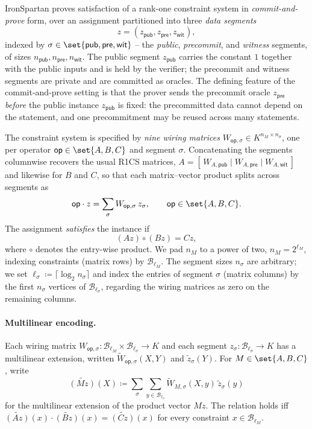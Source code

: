 \documentclass{article}
\theoremstyle{definition}
\newcommand*{\mle}{\widetilde}
\newcommand{\BB}{\mathcal{B}}
\begin{document}
IronSpartan proves satisfaction of a rank-one constraint system in \emph{commit-and-prove} form, over an assignment partitioned into three \emph{data segments}
\[
  z = (z_{\textsf{pub}}, z_{\textsf{pre}}, z_{\textsf{wit}}),
\]
indexed by $\sigma \in \set{\textsf{pub}, \textsf{pre}, \textsf{wit}}$ -- the \emph{public}, \emph{precommit}, and \emph{witness} segments, of sizes $n_{\textsf{pub}}, n_{\textsf{pre}}, n_{\textsf{wit}}$. The public segment $z_{\textsf{pub}}$ carries the constant $1$ together with the public inputs and is held by the verifier; the precommit and witness segments are private and are committed as oracles. The defining feature of the commit-and-prove setting is that the prover sends the precommit oracle $z_{\textsf{pre}}$ \emph{before} the public instance $z_{\textsf{pub}}$ is fixed: the precommitted data cannot depend on the statement, and one precommitment may be reused across many statements.

The constraint system is specified by \emph{nine wiring matrices} $W_{\textsf{op}, \sigma} \in K^{n_M \times n_\sigma}$, one per operator $\textsf{op} \in \set{A, B, C}$ and segment $\sigma$. Concatenating the segments columnwise recovers the usual R1CS matrices, $A = [\,W_{A, \textsf{pub}} \mid W_{A, \textsf{pre}} \mid W_{A, \textsf{wit}}\,]$ and likewise for $B$ and $C$, so that each matrix--vector product splits across segments as
\[
  \textsf{op} \cdot z = \sum_{\sigma} W_{\textsf{op}, \sigma}\, z_\sigma, \qquad \textsf{op} \in \set{A, B, C}.
\]
The assignment \emph{satisfies} the instance if
\[
  (Az) \circ (Bz) = Cz,
\]
where $\circ$ denotes the entry-wise product. We pad $n_M$ to a power of two, $n_M = 2^{\ell_M}$, indexing constraints (matrix rows) by $\BB_{\ell_M}$. The segment sizes $n_\sigma$ are arbitrary; we set $\ell_\sigma \coloneqq \lceil \log_2 n_\sigma \rceil$ and index the entries of segment $\sigma$ (matrix columns) by the first $n_\sigma$ vertices of $\BB_{\ell_\sigma}$, regarding the wiring matrices as zero on the remaining columns.

\paragraph{Multilinear encoding.}
Each wiring matrix $W_{\textsf{op}, \sigma} \colon \BB_{\ell_M} \times \BB_{\ell_\sigma} \to K$ and each segment $z_\sigma \colon \BB_{\ell_\sigma} \to K$ has a multilinear extension, written $\mle{W}_{\textsf{op}, \sigma}(X, Y)$ and $\mle{z}_\sigma(Y)$. For $M \in \set{A, B, C}$, write
\[
  \mle{(Mz)}(X) \coloneqq \sum_{\sigma} \sum_{y \in \BB_{\ell_\sigma}} \mle{W}_{M, \sigma}(X, y)\, \mle{z}_\sigma(y)
\]
for the multilinear extension of the product vector $Mz$. The relation holds iff $\mle{(Az)}(x) \cdot \mle{(Bz)}(x) = \mle{(Cz)}(x)$ for every constraint $x \in \BB_{\ell_M}$.
\end{document}
